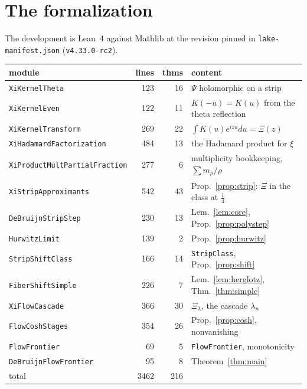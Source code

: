 \documentclass[11pt]{article}
\theoremstyle{definition}
\begin{document}
\section{The formalization}\label{sec:lean}

The development is Lean~4 against Mathlib \cite{Mathlib} at the revision pinned in \texttt{lake-manifest.json}
(\texttt{v4.33.0-rc2}).

\begin{center}
\begin{tabular}{lrrl}
\toprule
module & lines & thms & content \\
\midrule
\texttt{XiKernelTheta}                & 123 & 16 & $\Psi$ holomorphic on a strip \\
\texttt{XiKernelEven}                 & 122 & 11 & $K(-u)=K(u)$ from the theta reflection \\
\texttt{XiKernelTransform}            & 269 & 22 & $\int K(u)e^{izu}du=\Xi(z)$ \\
\texttt{XiHadamardFactorization}      & 484 & 13 & the Hadamard product for $\xi$ \\
\texttt{XiProductMultPartialFraction} & 277 &  6 & multiplicity bookkeeping, $\sum m_\rho/\rho$ \\
\texttt{XiStripApproximants}          & 542 & 43 & Prop.~\ref{prop:strip}: $\Xi$ in the class at $\tfrac14$ \\
\texttt{DeBruijnStripStep}            & 230 & 13 & Lem.~\ref{lem:core}, Prop.~\ref{prop:polystep} \\
\texttt{HurwitzLimit}                 & 139 &  2 & Prop.~\ref{prop:hurwitz} \\
\texttt{StripShiftClass}              & 166 & 14 & \texttt{StripClass}, Prop.~\ref{prop:shift} \\
\texttt{FiberShiftSimple}            & 226 &  7 & Lem.~\ref{lem:herglotz}, Thm.~\ref{thm:simple} \\
\texttt{XiFlowCascade}                & 366 & 30 & $\Xi_\lambda$, the cascade $\lambda_n$ \\
\texttt{FlowCoshStages}               & 354 & 26 & Prop.~\ref{prop:cosh}, nonvanishing \\
\texttt{FlowFrontier}                 &  69 &  5 & \texttt{FlowFrontier}, monotonicity \\
\texttt{DeBruijnFlowFrontier}         &  95 &  8 & Theorem~\ref{thm:main} \\
\midrule
total                                 & 3462 & 216 & \\
\bottomrule
\end{tabular}
\end{center}
\end{document}
